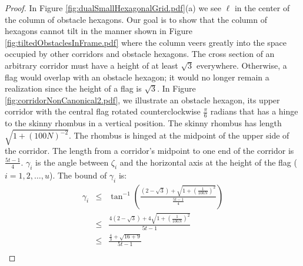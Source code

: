 \documentclass[10pt]{CSUNthesis}
\theoremstyle{plain}%
\theoremstyle{definition}
\theoremstyle{remark}
\newcommand{\lr}[1]{\left( #1 \right)}
\begin{document}
\begin{proof}
In Figure \ref{fig:dualSmallHexagonalGrid.pdf}(a) we see $\ell$ in the center of the column of obstacle hexagons.  
Our goal is to show that the column of hexagons cannot tilt in the manner shown in Figure \ref{fig:tiltedObstaclesInFrame.pdf} where the column veers greatly into the space occupied by other corridors and obstacle hexagons.
The cross section of an arbitrary corridor must have a height of at least $\sqrt{3}$ everywhere. 
Otherwise, a flag would overlap with an obstacle hexagon; it would no longer remain a realization since the height of a flag is $\sqrt{3}$.
In Figure \ref{fig:corridorNonCanonical2.pdf}, we illustrate an obstacle hexagon, its upper corridor with the central flag rotated counterclockwise $\frac{\pi}{6}$ radians that has a hinge to the skinny rhombus in a vertical position.  
The skinny rhombus has length $\sqrt{1 + \lr{100N}^{-2}}$.
The rhombus is hinged at the midpoint of the upper side of the corridor.
The length from a corridor's midpoint to one end of the corridor is $\frac{5t-1}{4}$.
$\gamma_i$ is the angle between $\zeta_i$ and the horizontal axis at the height of the flag ($i = 1,2,\ldots, u$).
The bound of $\gamma_i$ is:
\begin{equation}\label{eqn:alphaBound}
\begin{array}{rcl}
\gamma_i & \leq & \tan^{-1} \lr{
								\frac{\lr{2 - \sqrt{3}} + \sqrt{1 + \lr{\frac{1}{100N}}^2}	}
									 {	\frac{5t -1}{4}	}
								}\\
& \leq & \frac{
				4 \lr{2 - \sqrt{3}} + 4\sqrt{1 + \lr{\frac{1}{100N}}^2}	}
			  {	
			  	5t -1	
			  }\\
& \leq & \frac{
				\frac{4}{3} + \sqrt{16 + 9}	}
			  {	
			  	5t -1	
			  } \\


\end{array}
\end{equation}
\end{proof}
\end{document}
